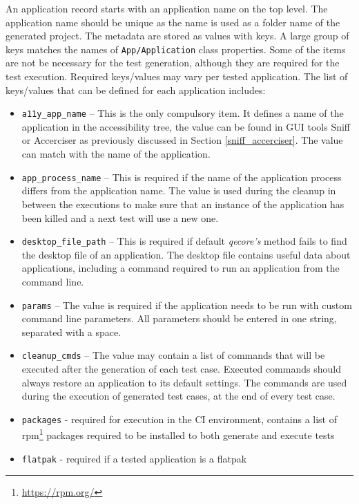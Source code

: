 An application record starts with an application name on the top level. The application name should be unique as the name is used as a folder name of the generated project. The metadata are stored as values with keys. A large group of keys matches the names of \texttt{App/Application} class properties. Some of the items are not be necessary for the test generation, although they are required for the test execution. Required keys/values may vary per tested application. The list of keys/values that can be defined for each application includes:

\begin{itemize}
    \item \texttt{a11y\_app\_name} -- This is the only compulsory item. It defines a name of the application in the accessibility tree, the value can be found in GUI tools Sniff or Accerciser as previously discussed in Section \ref{sniff_accerciser}. The value can match with the name of the application.
     \item \texttt{app\_process\_name} -- This is required if the name of the application process differs from the application name. The value is used during the cleanup in between the executions to make sure that an instance of the application has been killed and a next test will use a new one.
     \item \texttt{desktop\_file\_path} -- This is required if default \textit{qecore's} method fails to find the desktop file of an application. The desktop file contains useful data about applications, including a command required to run an application from the command line.
     \item \texttt{params} --  The value is required if the application needs to be run with custom command line parameters. All parameters should be entered in one string, separated with a space.
     \item \texttt{cleanup\_cmds} -- The value may contain a list of commands that will be executed after the generation of each test case. Executed commands should always restore an application to its default settings. The commands are used during the execution of generated test cases, at the end of every test case. 
     \item \texttt{packages} - required for execution in the CI environment, contains a list of rpm\footnote{\url{https://rpm.org/}} packages required to be installed to both generate and execute tests
     \item \texttt{flatpak} - required if a tested application is a flatpak
\end{itemize}

